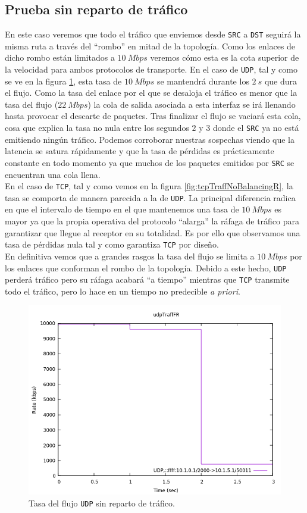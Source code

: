 \documentclass[11pt]{article}
\begin{document}
        \subsection{Prueba sin reparto de tráfico}
            En este caso veremos que todo el tráfico que enviemos desde \texttt{SRC} a \texttt{DST} seguirá la misma ruta a través del ``rombo'' en mitad de la topología. Como los enlaces de dicho rombo están limitados a $10\ Mbps$ veremos cómo esta es la cota superior de la velocidad para ambos protocolos de transporte. En el caso de \texttt{UDP}, tal y como se ve en la figura \ref{fig:udpTraffNoBalancingR}, esta tasa de $10\ Mbps$ se mantendrá durante los $2\ s$ que dura el flujo. Como la tasa del enlace por el que se desaloja el tráfico es menor que la tasa del flujo ($22\ Mbps$) la cola de salida asociada a esta interfaz se irá llenando hasta provocar el descarte de paquetes. Tras finalizar el flujo se vaciará esta cola, cosa que explica la tasa no nula entre los segundos $2$ y $3$ donde el \texttt{SRC} ya no está emitiendo ningún tráfico. Podemos corroborar nuestras sospechas viendo que la latencia se satura rápidamente y que la tasa de pérdidas es prácticamente constante en todo momento ya que muchos de los paquetes emitidos por \texttt{SRC} se encuentran una cola llena.\\

            En el caso de \texttt{TCP}, tal y como vemos en la figura \ref{fig:tcpTraffNoBalancingR}, la tasa se comporta de manera parecida a la de \texttt{UDP}. La principal diferencia radica en que el intervalo de tiempo en el que mantenemos una tasa de $10\ Mbps$ es mayor ya que la propia operativa del protocolo ``alarga'' la ráfaga de tráfico para garantizar que llegue al receptor en su totalidad. Es por ello que observamos una tasa de pérdidas nula tal y como garantiza \texttt{TCP} por diseño.\\

            En definitiva vemos que a grandes rasgos la tasa del flujo se limita a $10\ Mbps$ por los enlaces que conforman el rombo de la topología. Debido a este hecho, \texttt{UDP} perderá tráfico pero su ráfaga acabará ``a tiempo'' mientras que \texttt{TCP} transmite todo el tráfico, pero lo hace en un tiempo no predecible \textit{a priori}.

            \begin{figure}
                \centering
                \includegraphics[width=0.6\linewidth]{udpTraffNoBalancingR.png}
                \caption{Tasa del flujo \texttt{UDP} sin reparto de tráfico.}
                \label{fig:udpTraffNoBalancingR}
            \end{figure}
\end{document}

